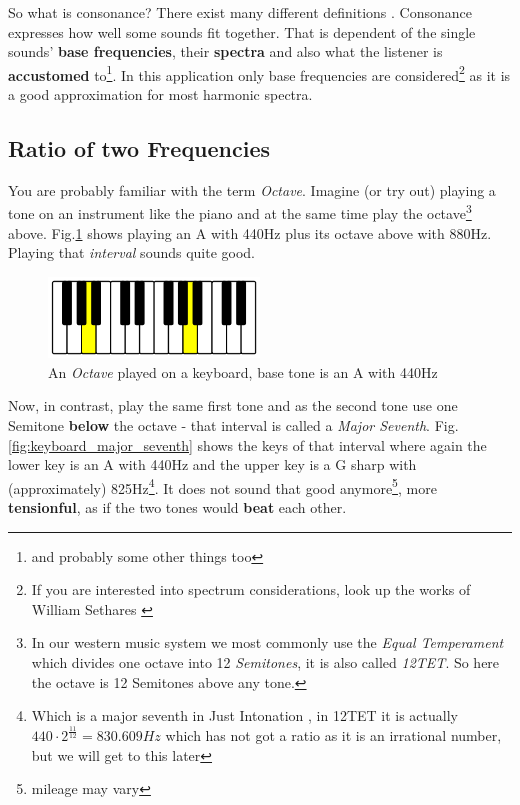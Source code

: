 \documentclass[12pt,a4paper,titlepage,oneside]{report}
\begin{document}
So what is consonance? There exist many different definitions \cite{bib:cons_diss}. Consonance expresses how well some sounds fit together. That is dependent of the single sounds' \textbf{base frequencies}, their \textbf{spectra} and also what the listener is \textbf{accustomed} to\footnote{and probably some other things too}. In this application only base frequencies are considered\footnote{If you are interested into spectrum considerations, look up the works of William Sethares \cite{bib:sethWiki} \cite{bib:adaptun}} as it is a good approximation for most harmonic spectra.


\subsection{Ratio of two Frequencies}

You are probably familiar with the term \textit{Octave}. Imagine (or try out) playing a tone on an instrument like the piano and at the same time play the octave\footnote{In our western music system we most commonly use the \textit{Equal Temperament} \cite{bib:12tet} which divides one octave into 12 \textit{Semitones}, it is also called \textit{12TET}. So here the octave is 12 Semitones above any tone.} above. Fig.\ref{fig:keyboard_octave} shows playing an A with 440Hz plus its octave above with 880Hz. Playing that \textit{interval} sounds quite good.

\begin{figure}[!ht]
\includegraphics[width=0.5\textwidth]{images/keyboard_octave.png}
\centering
\caption{An \textit{Octave} played on a keyboard, base tone is an A with 440Hz}
\label{fig:keyboard_octave}
\end{figure}

Now, in contrast, play the same first tone and as the second tone use one Semitone \textbf{below} the octave - that interval is called a \textit{Major Seventh}. Fig.\ref{fig:keyboard_major_seventh} shows the keys of that interval where again the lower key is an A with 440Hz and the upper key is a G sharp with (approximately) 825Hz\footnote{Which is a major seventh in Just Intonation \cite{bib:just}, in 12TET it is actually $440 \cdot 2^{\frac{11}{12}} = 830.609Hz$ which has not got a ratio as it is an irrational number, but we will get to this later}. It does not sound that good anymore\footnote{mileage may vary}, more \textbf{tensionful}, as if the two tones would \textbf{beat} each other.
\end{document}
